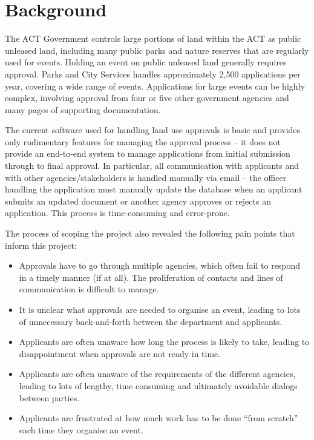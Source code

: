 \documentclass[12pt,a4paper,twosided]{article}
\begin{document}
\section{Background}\label{background}

The ACT Government controls large portions of land within the ACT as
public unleased land, including many public parks and nature reserves
that are regularly used for events. Holding an event on public unleased
land generally requires approval. Parks and City Services handles
approximately 2,500 applications per year, covering a wide range of
events. Applications for large events can be highly complex, involving
approval from four or five other government agencies and many pages of
supporting documentation.

The current software used for handling land use approvals is basic and
provides only rudimentary features for managing the approval process --
it does not provide an end-to-end system to manage applications from
initial submission through to final approval. In particular, all
communication with applicants and with other agencies/stakeholders is
handled manually via email -- the officer handling the application must
manually update the database when an applicant submits an updated
document or another agency approves or rejects an application. This
process is time-consuming and error-prone.

The process of scoping the project also revealed the following pain
points that inform this project:

\begin{itemize}
\itemsep1pt\parskip0pt
\item
  Approvals have to go through multiple agencies, which often fail to
  respond in a timely manner (if at all). The proliferation of contacts
  and lines of communication is difficult to manage.
\item
  It is unclear what approvals are needed to organise an event, leading
  to lots of unnecessary back-and-forth between the department and
  applicants.
\item
  Applicants are often unaware how long the process is likely to take,
  leading to disappointment when approvals are not ready in time.
\item
  Applicants are often unaware of the requirements of the different
  agencies, leading to lots of lengthy, time consuming and ultimately
  avoidable dialogs between parties.
\item
  Applicants are frustrated at how much work has to be done ``from
  scratch'' each time they organise an event.
\end{itemize}
\end{document}
